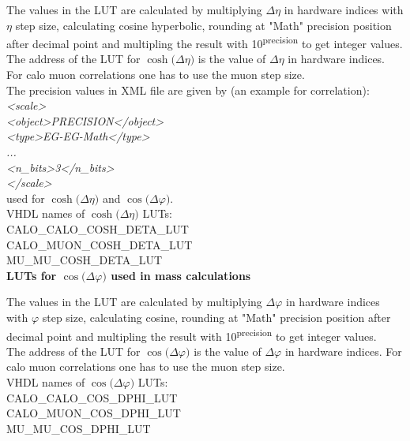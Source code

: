The values in the LUT are calculated by multiplying $\Delta\eta$ in hardware indices with $\eta$ step size, calculating cosine hyperbolic, rounding at "Math" precision position after decimal point and multipling the result with 10\textsuperscript{\tiny{precision}} to get integer values.\\
The address of the LUT for $\cosh($$\Delta\eta$$)$ is the value of $\Delta\eta$ in hardware indices.\\
For calo muon correlations one has to use the muon step size.\\

The precision values in XML file are given by (an example for \egamma \egamma correlation):\\
\textit{<scale>\\
    <object>PRECISION</object>\\
    <type>EG-EG-Math</type>\\
    ...\\
    <n\_bits>3</n\_bits>\\
</scale>}\\
used for $\cosh($$\Delta\eta$$)$ and $\cos($$\Delta\varphi$$)$.\\

VHDL names of $\cosh($$\Delta\eta$$)$ LUTs:\\
CALO\_CALO\_COSH\_DETA\_LUT\\
CALO\_MUON\_COSH\_DETA\_LUT\\
MU\_MU\_COSH\_DETA\_LUT\\

\textbf{LUTs for $\cos($$\Delta\varphi$$)$ used in mass calculations}
\label{sec:gtl:calc_luts_cos_delta_phi}

The values in the LUT are calculated by multiplying $\Delta\varphi$ in hardware indices with $\varphi$ step size, calculating cosine, rounding at "Math" precision position after decimal point and multipling the result with 10\textsuperscript{\tiny{precision}} to get integer values.\\
The address of the LUT for $\cos($$\Delta\varphi$$)$ is the value of $\Delta\varphi$ in hardware indices.
For calo muon correlations one has to use the muon step size.\\

VHDL names of $\cos($$\Delta\varphi$$)$ LUTs:\\
CALO\_CALO\_COS\_DPHI\_LUT\\
CALO\_MUON\_COS\_DPHI\_LUT\\
MU\_MU\_COS\_DPHI\_LUT\\

